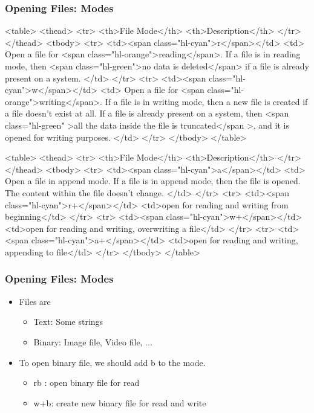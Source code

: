 \documentclass{../c-lecture}
\begin{document}
\begin{frame}
  \begin{frame}
    \frametitle{Opening Files: Modes}
    <table>
      <thead>
        <tr>
          <th>File Mode</th>
          <th>Description</th>
        </tr>
      </thead>
      <tbody>
        <tr>
          <td><span class="hl-cyan">r</span></td>
          <td>
            Open a file for <span class="hl-orange">reading</span>. If a file is
            in reading mode, then
            <span class="hl-green">no data is deleted</span> if a file is
            already present on a system.
          </td>
        </tr>
        <tr>
          <td><span class="hl-cyan">w</span></td>
          <td>
            Open a file for <span class="hl-orange">writing</span>. If a file is
            in writing mode, then a new file is created if a file doesn't exist
            at all. If a file is already present on a system, then
            <span class="hl-green"
              >all the data inside the file is truncated</span
            >, and it is opened for writing purposes.
          </td>
        </tr>
      </tbody>
    </table>
  \end{frame}
  \begin{frame}
    <table>
      <thead>
        <tr>
          <th>File Mode</th>
          <th>Description</th>
        </tr>
      </thead>
      <tbody>
        <tr>
          <td><span class="hl-cyan">a</span></td>
          <td>
            Open a file in append mode. If a file is in append mode, then the
            file is opened. The content within the file doesn't change.
          </td>
        </tr>
        <tr>
          <td><span class="hl-cyan">r+</span></td>
          <td>open for reading and writing from beginning</td>
        </tr>
        <tr>
          <td><span class="hl-cyan">w+</span></td>
          <td>open for reading and writing, overwriting a file</td>
        </tr>
        <tr>
          <td><span class="hl-cyan">a+</span></td>
          <td>open for reading and writing, appending to file</td>
        </tr>
      </tbody>
    </table>
  \end{frame}
\end{frame}
\begin{frame}
  \frametitle{Opening Files: Modes}
  \begin{itemize}
    \item Files are
    \begin{itemize}
      \item Text: Some strings
      \item Binary: Image file, Video file, ...
    \end{itemize}
    \item To open binary file, we should add b to the mode.
    \begin{itemize}
      \item rb : open binary file for read
      \item w+b: create new binary file for read and write
    \end{itemize}
  \end{itemize}
\end{frame}
\end{document}
